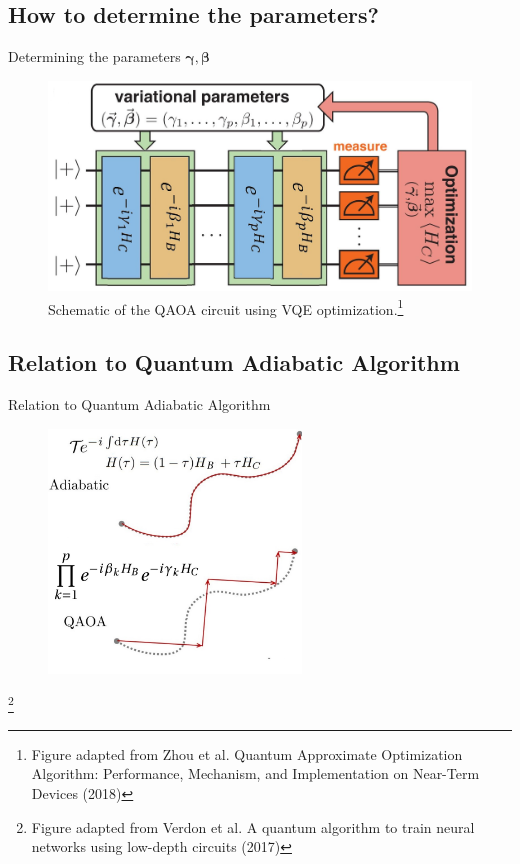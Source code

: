 \documentclass{beamer}
\renewcommand{\vec}[1]{\boldsymbol{#1}}
\newcommand\blfootnote[1]{%
	\begingroup
	\renewcommand\thefootnote{}\footnote{#1}%
	\addtocounter{footnote}{-1}%
	\endgroup
}
\begin{document}
{\subsection{How to determine the parameters?}
\begin{frame}{Determining the parameters $\vec{\gamma}, \vec{\beta}$}
\begin{figure}
	\includegraphics[width=\textwidth]{figures/qaoa_idea_edit_complete}
	\caption{Schematic of the QAOA circuit using VQE optimization.\footnote{Figure adapted from Zhou et al. Quantum Approximate Optimization Algorithm: Performance, Mechanism, and Implementation on Near-Term Devices (2018)}}
\end{figure}
\end{frame}

\subsection{Relation to Quantum Adiabatic Algorithm}
\begin{frame}{Relation to Quantum Adiabatic Algorithm}
\begin{figure}
	\centering
	\includegraphics[width=0.6\textwidth]{figures/concept_relation_qaoa_and_qaa_edit}
\end{figure}
\blfootnote{Figure adapted from Verdon et al. A quantum algorithm to train neural networks using low-depth circuits (2017)}
\end{frame}

}
\end{document}
